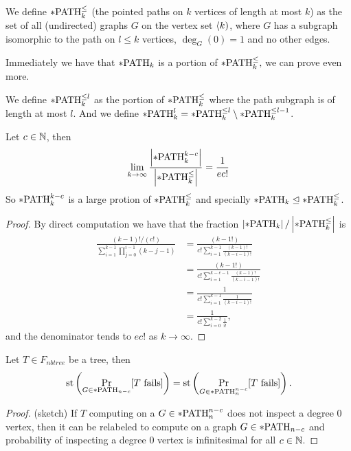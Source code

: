 \begin{defi}
We define $*\text{PATH}^\leq_k$ (the pointed paths on $k$ vertices of length at most $k$) as the set of all (undirected) graphs $G$ on the vertex set $\langle k)$, where $G$ has a subgraph isomorphic to the path on $l\leq k$ vertices, $\deg_G(0)=1$ and no other edges.
\end{defi}

Immediately we have that $*\text{PATH}_k$ is a portion of $*\text{PATH}^\leq_k,$ we can prove even more.

\begin{defi}
We define $*\text{PATH}_k^{\leq l}$ as the portion of $*\text{PATH}^\leq_k$ where the path subgraph is of length at most $l$. And we define $*\text{PATH}_k^{l}=*\text{PATH}_k^{\leq l}\setminus *\text{PATH}_k^{\leq l-1}$.

\end{defi}


\begin{lemm}
Let $c\in \mathbb{N}$, then 
\[\lim_{k\to\infty}\frac{\left|{*\text{PATH}_k^{k-c}}\right|}{\left|{*\text{PATH}^\leq_k}\right|}=\frac{1}{ec!}\]
So $*\text{PATH}_k^{k-c}$ is a large protion of $*\text{PATH}^\leq_k$ and specially $*\text{PATH}_k\trianglelefteq *\text{PATH}^\leq_k$.
\end{lemm}
\begin{proof}
By direct computation we have that the fraction $\left|{*\text{PATH}_k}\right|/\left|{*\text{PATH}^\leq_k}\right|$ is
\begin{align}
\frac{(k-1)!/(c!)}{\sum_{i=1}^{k-1}\prod_{j=0}^{i-1}(k-j-1)}&=\frac{(k-1!)}{c!\sum_{i=1}^{k-1}\frac{(k-1)!}{(k-i-1)!}}\\
&=\frac{(k-1!)}{c!\sum_{i=1}^{k-c-1}\frac{(k-1)!}{(k-i-1)!}}\\
&=\frac{1}{c!\sum_{i=1}^{k-1}\frac{1}{(k-i-1)!}}\\
&=\frac{1}{c!\sum_{i=0}^{k-2}\frac{1}{i!}},
\end{align}
and the denominator tends to $ec!$ as $k\to\infty$.
\end{proof}

\begin{lemm}\label{lemmpathnnc}
Let $T\in F_{nbtree}$ be a tree, then
\[\text{st}\left(\Pr_{G\in*\text{PATH}_{n-c}}[\text{$T$ fails}]\right )=\text{st}\left(\Pr_{G\in*\text{PATH}_{n}^{n-c}}[\text{$T$ fails}]\right).\]
\end{lemm}
\begin{proof}(sketch)
If $T$ computing on a $G\in*\text{PATH}_n^{n-c}$ does not inspect a degree 0 vertex, then it can be relabeled to compute on a graph $G\in*\text{PATH}_{n-c}$ and probability of inspecting a degree 0 vertex is infinitesimal for all $c\in \mathbb{N}$.
\end{proof}

